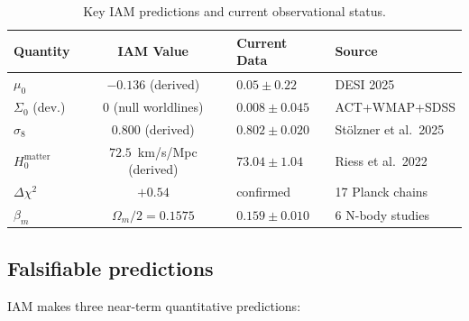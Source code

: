 \documentclass[12pt]{article}
\newcommand{\Oms}{\Omega_m}
\newcommand{\bm}{\beta_m}
\begin{document}
\begin{table}[h]
  \centering
  \caption{Key IAM predictions and current observational status.}
  \label{tab:numbers}
  \renewcommand{\arraystretch}{1.35}
  \begin{tabular}{lcll}
    \toprule
    \textbf{Quantity} & \textbf{IAM Value} & \textbf{Current Data} & \textbf{Source} \\
    \midrule
    $\mu_0$          & $-0.136$ (derived)     & $0.05\pm0.22$            & DESI 2025 \\
    $\Sigma_0$ (dev.)& $0$ (null worldlines)  & $0.008\pm0.045$          & ACT+WMAP+SDSS \\
    $\sigma_8$       & $0.800$ (derived)      & $0.802\pm0.020$          & St\"{o}lzner et al.\ 2025 \\
    $H_0^\mathrm{matter}$ & $72.5$~km/s/Mpc (derived) & $73.04\pm1.04$    & Riess et al.\ 2022 \\
    $\Delta\chi^2$   & $+0.54$                & confirmed                & 17 Planck chains \\
    $\bm$            & $\Oms/2 = 0.1575$      & $0.159\pm0.010$          & 6 N-body studies \\
    \bottomrule
  \end{tabular}
\end{table}

\subsection{Falsifiable predictions}

IAM makes three near-term quantitative predictions:
\end{document}
